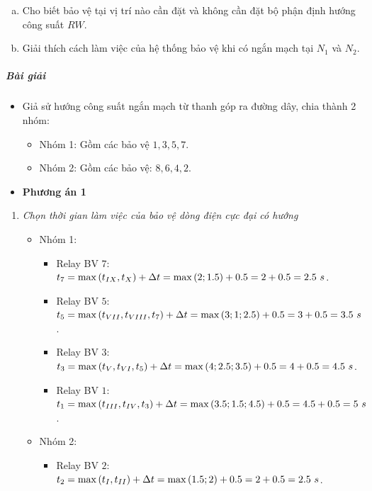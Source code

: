 \documentclass[12pt,a4paper]{article}
\begin{document}
\begin{enumerate}
\begin{enumerate}[a.]
					\item Cho biết bảo vệ tại vị trí nào cần đặt và không cần đặt bộ phận định hướng công suất $RW$.
					
					\item Giải thích cách làm việc của hệ thống bảo vệ khi có ngắn mạch tại $N_1$ và $N_2$.
				\end{enumerate}
				
			\subparagraph{Bài giải}
				\begin{itemize}
					\item Giả sử hướng công suất ngắn mạch từ thanh góp ra đường dây, chia thành 2 nhóm:
						\begin{itemize}
							\item Nhóm 1: Gồm các bảo vệ $1, 3, 5, 7$.
							
							\item Nhóm 2: Gồm các bảo vệ: $8, 6, 4, 2$.
						\end{itemize}
						
					\item \textbf{Phương án 1}
				\end{itemize}
				
				\begin{enumerate}[\it a.]
				\item \emph{Chọn thời gian làm việc của bảo vệ dòng điện cực đại có hướng}
					\begin{itemize}					
						\item Nhóm 1:
							\begin{itemize}
								\item Relay BV $7$: $t_7 = \max\left({t_{IX}, t_{X}}\right) + \Delta t = \max\left({2; 1.5}\right) + 0.5 = 2 + 0.5 = 2.5 ~s$.
								
								\item Relay BV $5$: $t_5 = \max\left({t_{VII}, t_{VIII}, t_7}\right) + \Delta t = \max\left({3; 1; 2.5}\right) + 0.5 = 3 + 0.5 = 3.5 ~s$.
								
								\item Relay BV $3$: $t_3 = \max\left({t_{V}, t_{VI}, t_5}\right) + \Delta t = \max\left({4; 2.5; 3.5}\right) + 0.5 = 4 + 0.5 = 4.5 ~s$.
								
								\item Relay BV $1$: $t_1 = \max\left({t_{III}, t_{IV}, t_3}\right) + \Delta t = \max\left({3.5; 1.5; 4.5}\right) + 0.5 = 4.5 + 0.5 = 5 ~s$.			
							\end{itemize}
						
						\item Nhóm 2:
							\begin{itemize}
								\item Relay BV $2$: $t_2 = \max\left({t_{I}, t_{II}}\right) + \Delta t = \max\left({1.5; 2}\right) + 0.5 = 2 + 0.5 = 2.5 ~s$.
								

\end{itemize}
\end{itemize}
\end{enumerate}
\end{enumerate}
\end{document}
